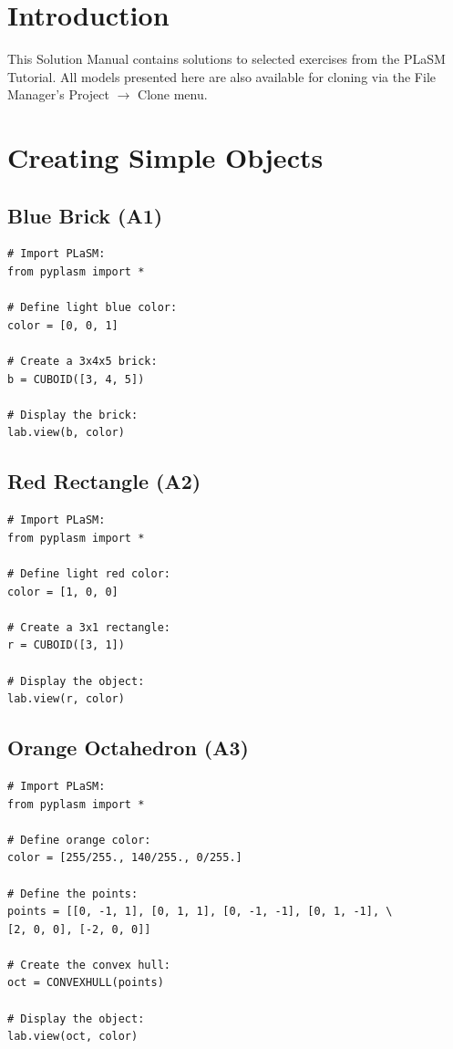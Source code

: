 \documentclass{article}
\begin{document}
\newpage

\pagestyle{plain}
\setcounter{page}{1}

\section{Introduction}

This Solution Manual contains solutions to selected exercises from the 
PLaSM Tutorial. All models presented here are also available for 
cloning via the File Manager's Project $\rightarrow$ Clone menu.

\section{Creating Simple Objects}

\subsection{Blue Brick (A1)}

\begin{verbatim}
# Import PLaSM:
from pyplasm import *

# Define light blue color:
color = [0, 0, 1]

# Create a 3x4x5 brick:
b = CUBOID([3, 4, 5])

# Display the brick:
lab.view(b, color)
\end{verbatim}


\subsection{Red Rectangle (A2)}

\begin{verbatim}
# Import PLaSM:
from pyplasm import *

# Define light red color:
color = [1, 0, 0]

# Create a 3x1 rectangle:
r = CUBOID([3, 1])

# Display the object:
lab.view(r, color)
\end{verbatim}


\subsection{Orange Octahedron (A3)}

\begin{verbatim}
# Import PLaSM:
from pyplasm import *

# Define orange color:
color = [255/255., 140/255., 0/255.]

# Define the points:
points = [[0, -1, 1], [0, 1, 1], [0, -1, -1], [0, 1, -1], \
[2, 0, 0], [-2, 0, 0]]

# Create the convex hull:
oct = CONVEXHULL(points)

# Display the object:
lab.view(oct, color)
\end{verbatim}
\end{document}
